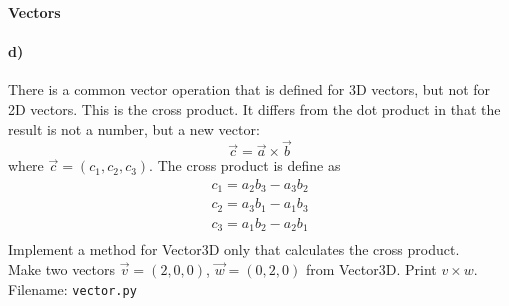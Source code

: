 \begin{Problem}{\textbf{Vectors}}
\paragraph{d)}
There is a common vector operation that is defined for 3D vectors, but not for 2D vectors. This is the cross product. It differs from the dot product in that the result is not a number, but a new vector:
\begin{equation*}
    \Vec{c} = \Vec{a} \times \Vec{b}
\end{equation*}
where $\Vec{c} = (c_1, c_2, c_3)$. The cross product is define as
\begin{align*}
    c_1 = a_2 b_3 - a_3 b_2\\
    c_2 = a_3 b_1 - a_1 b_3\\
    c_3 = a_1 b_2 - a_2 b_1\\
\end{align*}
Implement a method  for Vector3D only that calculates the cross product. \\
Make two vectors $\Vec{v}=(2,0,0)$, $\Vec{w}=(0,2,0)$ from Vector3D. Print $v\times w$.
\\
Filename: \texttt{vector.py}
\end{Problem}

